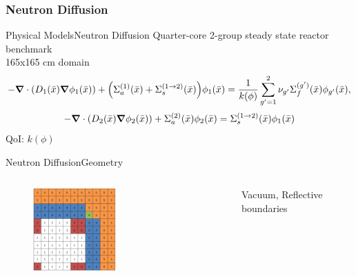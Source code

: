 \documentclass{beamer}
\newcommand{\xs}[2]{\ensuremath{\Sigma_{#1}^{(#2)}}}
\begin{document}
\subsubsection{Neutron Diffusion}
\begin{frame}{Physical Models}{Neutron Diffusion}\vspace{-20pt}
  Quarter-core 2-group steady state reactor benchmark \\165x165 cm domain 
  \footnotesize
  \begin{equation*}
    -\grad\cdot\qty( D_1(\bar x)\grad\phi_1(\bar x))+\qty(\xs{a}{1}(\bar x)+\xs{s}{1\to2}(\bar x))\phi_1(\bar x)
    = \frac{1}{k(\phi)}\sum_{g'=1}^2\nu_{g'}\xs{f}{g'}(\bar x)\phi_{g'}(\bar x),
  \end{equation*}
  \begin{equation*}
    -\grad \cdot\qty(D_2(\bar x)\grad \phi_2(\bar x))+\xs{a}{2}(\bar x)\phi_2(\bar x) = \xs{s}{1\to 2}(\bar
    x)\phi_1(\bar x)
  \end{equation*}
  QoI: $k(\phi)$
\end{frame}

\begin{frame}{Neutron Diffusion}{Geometry}%
  \begin{columns}
  \begin{column}{0.5\textwidth}
    \begin{figure}[h!]
      \centering
      \includegraphics[width=0.5\textwidth]{../../graphics/core}
    \end{figure}
  \end{column}
  \begin{column}{0.5\textwidth}
    Vacuum, Reflective boundaries
  \end{column}
  \end{columns}
\end{frame}
\end{document}
